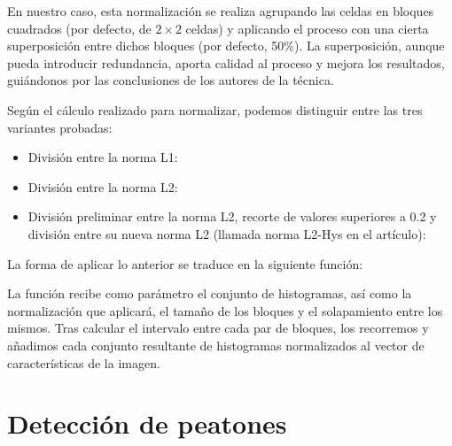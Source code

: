\documentclass[11pt,a4paper]{article}
\begin{document}
            \par
            En nuestro caso, esta normalización se realiza agrupando las celdas en bloques cuadrados (por defecto, de $2\times2$ celdas) y aplicando el proceso con una cierta superposición entre dichos bloques (por defecto, 50\%). La superposición, aunque pueda introducir redundancia, aporta calidad al proceso y mejora los resultados, guiándonos por las conclusiones de los autores de la técnica.

            \par
            Según el cálculo realizado para normalizar, podemos distinguir entre las tres variantes probadas:

            \begin{itemize}

                \item
                División entre la norma L1:

                \item
                División entre la norma L2:

                \item
                División preliminar entre la norma L2, recorte de valores superiores a 0.2 y división entre su nueva norma L2 (llamada norma L2-Hys en el artículo):

            \end{itemize}

            \par
            La forma de aplicar lo anterior se traduce en la siguiente función:


            \par
            La función recibe como parámetro el conjunto de histogramas, así como la normalización que aplicará, el tamaño de los bloques y el solapamiento entre los mismos. Tras calcular el intervalo entre cada par de bloques, los recorremos y añadimos cada conjunto resultante de histogramas normalizados al vector de características de la imagen.

\newpage

    \section{Detección de peatones}
\end{document}
